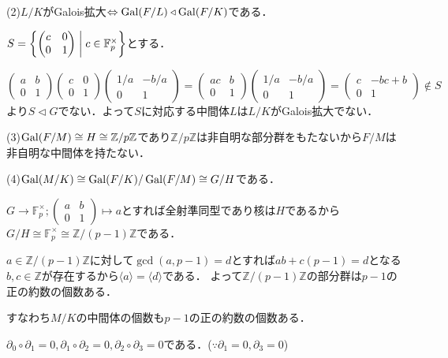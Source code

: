 \documentclass[
		book,
		head_space=20mm,
		foot_space=20mm,
		gutter=10mm,
		line_length=190mm
]{jlreq}
\begin{document}
(2)$L/K$がGalois拡大$\Leftrightarrow \mathop{\mathrm{Gal}}(F/L)\triangleleft \mathop{\mathrm{Gal}}(F/K)$である．

$S=\left\{ \begin{pmatrix}
c & 0 \\
0 & 1
\end{pmatrix}\mathrel{}\middle|\mathrel{} c\in \mathbb{F}_p^\times \right\}$とする．

$\begin{pmatrix}
a & b \\
0 & 1
\end{pmatrix}\begin{pmatrix}
c & 0 \\
0 & 1
\end{pmatrix}
\begin{pmatrix}
1/a & -b/a \\
0 & 1
\end{pmatrix}=\begin{pmatrix}
ac & b \\
0 & 1
\end{pmatrix}\begin{pmatrix}
1/a & -b/a \\
0 & 1
\end{pmatrix}=\begin{pmatrix}
c & -bc+b \\
0 & 1
\end{pmatrix}\notin S$より$S\triangleleft G$でない．よって$S$に対応する中間体$L$は$L/K$がGalois拡大でない．

(3)$\mathop{\mathrm{Gal}}(F/M)\cong H \cong \mathbb{Z}/p \mathbb{Z}$であり$\mathbb{Z}/p \mathbb{Z}$は非自明な部分群をもたないから$F/M$は非自明な中間体を持たない．

(4)$\mathop{\mathrm{Gal}}(M/K)\cong \mathop{\mathrm{Gal}}(F/K)/ \mathop{\mathrm{Gal}}(F/M)\cong G/H$である．

$G \rightarrow \mathbb{F}_p^\times;\begin{pmatrix}
a & b \\
0 & 1
\end{pmatrix} \mapsto a$とすれば全射準同型であり核は$H$であるから$G/H \cong \mathbb{F}_p^\times\cong \mathbb{Z}/(p-1)\mathbb{Z}$である．

$a \in \mathbb{Z}/(p-1)\mathbb{Z}$に対して$\gcd(a,p-1)=d$とすれば$ab+c(p-1)=d$となる$b,c\in \mathbb{Z}$が存在するから$\langle a \rangle=\langle d \rangle$である．
よって$\mathbb{Z} /(p-1)\mathbb{Z}$の部分群は$p-1$の正の約数の個数ある．

すなわち$M/K$の中間体の個数も$p-1$の正の約数の個数ある．

$\partial_0 \circ \partial_1=0,\partial_1 \circ \partial_2=0,\partial_2 \circ \partial_3=0$である．($\because \partial_1=0,\partial_3=0$)
\end{document}
